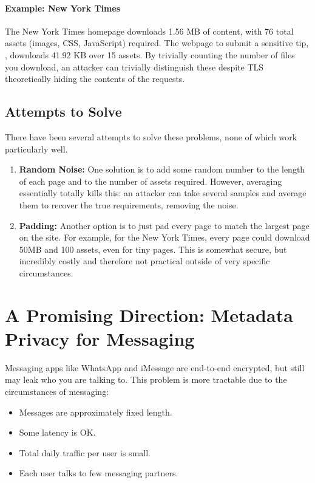 \paragraph{Example: New York Times} The New York Times homepage  downloads 1.56 MB of content, with 76 total assets (images, CSS, JavaScript) required. The webpage to submit a sensitive tip, , downloads 41.92 KB over 15 assets. By trivially counting the number of files you download, an attacker can trivially distinguish these despite TLS theoretically hiding the contents of the requests.

\subsection{Attempts to Solve}
There have been several attempts to solve these problems, none of which work particularly well. 

\begin{enumerate}
	\item \textbf{Random Noise:} One solution is to add some random number to the length of each page and to the number of assets required. However, averaging essentially totally kills this: an attacker can take several samples and average them to recover the true requirements, removing the noise. 
\item \textbf{Padding:} Another option is to just pad every page to match the largest page on the site. For example, for the New York Times, every page could download 50MB and 100 assets, even for tiny pages. This is somewhat secure, but incredibly costly and therefore not practical outside of very specific circumstances.
\end{enumerate}

\section{A Promising Direction: Metadata Privacy for Messaging}
Messaging apps like WhatsApp and iMessage are end-to-end encrypted, but still may leak who you are talking to. This problem is more tractable due to the circumstances of messaging:

\begin{itemize}
	\item Messages are approximately fixed length.
	\item Some latency is OK.
	\item Total daily traffic per user is small.
	\item Each user talks to few messaging partners.
\end{itemize}

